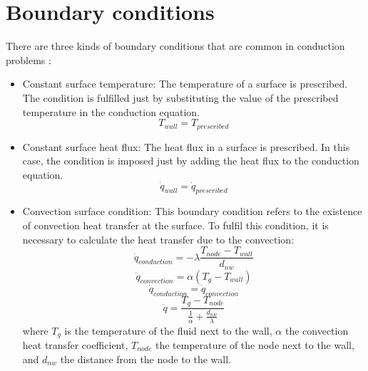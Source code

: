 \section{Boundary conditions}
There are three kinds of boundary conditions that are common in conduction problems \cite{Bergman2011}:
\begin{itemize}
	\item Constant surface temperature: The temperature of a surface is prescribed. The condition is fulfilled just by substituting the value of the prescribed temperature in the conduction equation.
	\begin{equation}
	T_{wall}=T_{prescribed}
	\end{equation}
	\item Constant surface heat flux: The heat flux in a surface is prescribed. In this case, the condition is imposed just by adding the heat flux to the conduction equation.
	\begin{equation}
	\dot{q}_{wall}=\dot{q}_{prescribed}
	\end{equation}
	\item Convection surface condition: This boundary condition refers to the existence of convection heat transfer at the surface. To fulfil this condition, it is necessary to calculate the heat transfer due to the convection:
	\begin{equation}
	\dot{q}_{conduction}=-\lambda\frac{T_{node}-T_{wall}}{d_{nw}}
	\end{equation}
	\begin{equation}
	\dot{q}_{convection}=\alpha\left(T_{g}-T_{wall}\right)
	\end{equation}
	\begin{equation}
	\dot{q}_{conduction}=\dot{q}_{convection}
	\end{equation}
	\begin{equation}
	\dot{q}=\frac{T_{g}-T_{node}}{\frac{1}{\alpha}+\frac{d_{nw}}{\lambda}}
	\end{equation}
	where $T_{g}$ is the temperature of the fluid next to the wall, $\alpha$ the convection heat transfer coefficient, $T_{node}$ the temperature of the node next to the wall, and $d_{nw}$ the distance from the node to the wall.
\end{itemize}